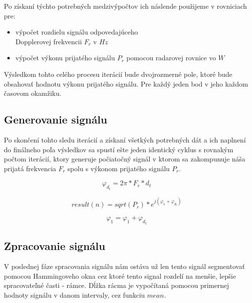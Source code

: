 \documentclass[slovak]{ExcelAtFIT} %
\begin{document}
    Po získaní týchto potrebných medzivýpočtov ich náslende použijeme v rovniciach pre:

    \begin{itemize}
      \item výpočet rozdielu signálu odpovedajúceho \\Dopplerovej frekvencii $F_{r}$ v $Hz$
      \item výpočet výkonu prijatého signálu $P_{r}$ pomocou radarovej rovnice vo $W$
    \end{itemize}

    Výsledkom tohto celého procesu iterácií bude dvojrozmerné pole, ktoré bude obsahovať hodnotu výkonu prijatého signálu. Pre každý jeden bod v jeho každom časovom okamžiku.

    \subsection{Generovanie signálu}

    \hspace{0.6cm}Po skončení tohto sledu iterácií a získaní všetkých potrebných dát a ich naplnení do finálneho poľa výsled\-kov sa spustí ešte jeden identický cyklus s rovnakým počtom iterácií, ktory generuje počiatočný signál v ktorom sa zakompunuje náša prijatá frekvencia $F_{r}$ spolu s výkonom prijatého signálu $P_{r}$.\newline  

    \begin{equation} \label{eq:631}
      \varphi_{d_{t}} = 2\pi * F_{r} * d_{t}
    \end{equation}

    \begin{equation} \label{eq:632}
      result(n) = sqrt(P_{r})*e^{j(\varphi_{1} + \varphi_{d_{t}})}
    \end{equation}

    \begin{equation} \label{eq:633}
    \varphi_{1} = \varphi_{1} +  \varphi_{d_{t}}
    \end{equation}    

    \subsection{Zpracovanie signálu}

    \hspace{0.6cm}V poslednej fáze spracovania signálu nám ostáva už len tento signál segmentovať pomocou Hammingoveho okna cez ktoré tento signal rozdelí na menšie, lepšie spracovateľné časti - rámce. Dĺžka rácma je vypočítaná pomocou primernej hodnoty signálu v da\-nom intervaly, cez funkciu $mean$.
\end{document}
